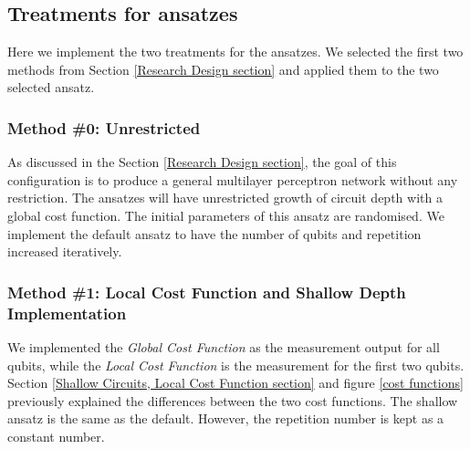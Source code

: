 \subsection{Treatments for ansatzes}
Here we implement the two treatments for the ansatzes.
We selected the first two methods from Section \ref{Research Design section} and applied them to the two selected ansatz.

\subsubsection{Method \#0: Unrestricted}
As discussed in the Section \ref{Research Design section}, the goal of this configuration is to produce a general multilayer perceptron network without any restriction.
The ansatzes will have unrestricted growth of circuit depth with a global cost function. 
The initial parameters of this ansatz are randomised.
We implement the default ansatz to have the number of qubits and repetition increased iteratively.

\subsubsection{Method \#1: Local Cost Function and Shallow Depth Implementation}
We implemented the \textit{Global Cost Function} as the measurement output for all qubits, while the \textit{Local Cost Function} is the measurement for the first two qubits.
Section \ref{Shallow Circuits, Local Cost Function section} and figure \ref{cost functions} previously explained the differences between the two cost functions.
The shallow ansatz is the same as the default. 
However, the repetition number is kept as a constant number.